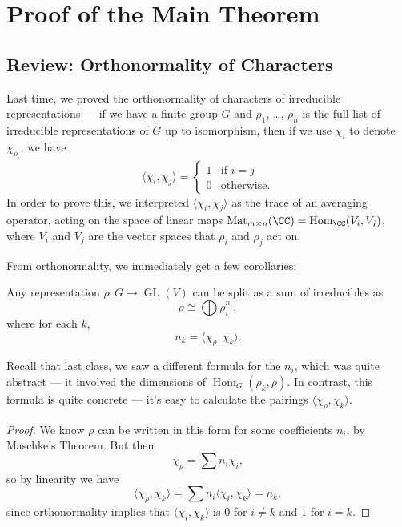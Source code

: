 

\section{Proof of the Main Theorem}

\subsection{Review: Orthonormality of Characters}

Last time, we proved the orthonormality of characters of irreducible representations --- if we have a finite group $G$ and $\rho_1$, \ldots, $\rho_n$ is the full list of irreducible representations of $G$ up to isomorphism, then if we use $\chi_i$ to denote $\chi_{\rho_i}$, we have \[\langle \chi_i, \chi_j \rangle = \begin{cases} 1 & \text{if $i = j$} \\ 0 & \text{otherwise}.\end{cases}\] 
In order to prove this, we interpreted $\langle \chi_i, \chi_j \rangle$ as the trace of an averaging operator, acting on the space of linear maps $\operatorname{Mat}_{m \times n}(\CC) = \operatorname{Hom}_{\CC}(V_i, V_j)$, where $V_i$ and $V_j$ are the vector spaces that $\rho_i$ and $\rho_j$ act on.

From orthonormality, we immediately get a few corollaries:

\begin{corollary} \label{coeffs from orthonormality}
    Any representation $\rho : G \to \operatorname{GL}(V)$ can be split as a sum of irreducibles as \[\rho \cong \bigoplus \rho_i^{n_i},\] where for each $k$, \[n_k = \langle \chi_\rho, \chi_k \rangle.\] 
\end{corollary}

Recall that last class, we saw a different formula for the $n_i$, which was quite abstract --- it involved the dimensions of $\operatorname{Hom}_G(\rho_k, \rho)$. In contrast, this formula is quite concrete --- it's easy to calculate the pairings $\langle \chi_\rho, \chi_k \rangle$. 

\begin{proof}
    We know $\rho$ can be written in this form for some coefficients $n_i$, by Maschke's Theorem. But then \[\chi_\rho = \sum n_i\chi_i,\] so by linearity we have \[\langle \chi_\rho, \chi_k \rangle = \sum n_i\langle \chi_i, \chi_k \rangle = n_k,\] since orthonormality implies that $\langle \chi_i, \chi_k \rangle$ is $0$ for $i \neq k$ and $1$ for $i = k$.
\end{proof}


